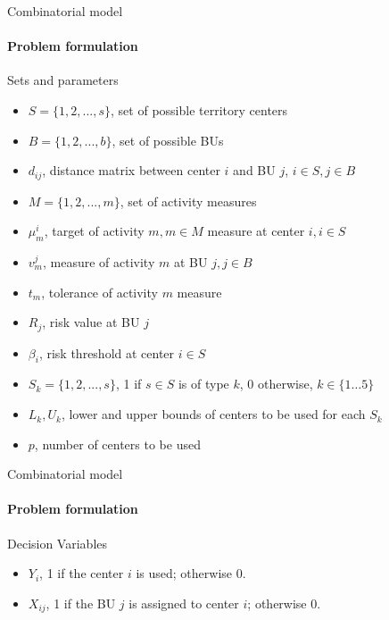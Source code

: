 \documentclass{beamer}
\begin{document}
\begin{frame}{Combinatorial model}
    \framesubtitle{Problem formulation}
        Sets and parameters
        \begin{itemize}
            \item $S = \{1, 2, ..., s\}$, set of possible territory centers
            \item $B = \{1, 2, ..., b\}$, set of possible BUs
            \item $d_{ij}$, distance matrix between center $i$ and BU $j$, $i \in S, j \in B$
            \item $M = \{1,2, ..., m\}$, set of activity measures
            \item $\mu_m^i$,  target of activity $m, m \in M$ measure at center $i, i \in S$
            \item $v_m^j$, measure of activity $m$ at BU $j, j\in B$
            \item $t_m$, tolerance of activity $m$ measure
            \item $R_j$, risk value at BU $j$
            \item $\beta_i$, risk threshold at center $i \in S$
            \item $S_k = \{1,2,...,s\}$, 1 if $s \in S$ is of type $k$, 0 otherwise, $k \in \{1\ldots 5\}$
            \item $L_k, U_k$, lower and upper bounds of centers to be used for each $S_k$
            \item $p$, number of centers to be used
        \end{itemize}
        
\end{frame}

\begin{frame}{Combinatorial model}
    \framesubtitle{Problem formulation}
        Decision Variables 
        \begin{itemize}
            \item \small $Y_i$, 1 if the center $i$ is used; otherwise 0.
            \item \small $X_{ij}$, 1 if the BU $j$ is assigned to center $i$; otherwise 0.
        \end{itemize}
\end{frame}

        
\end{document}
